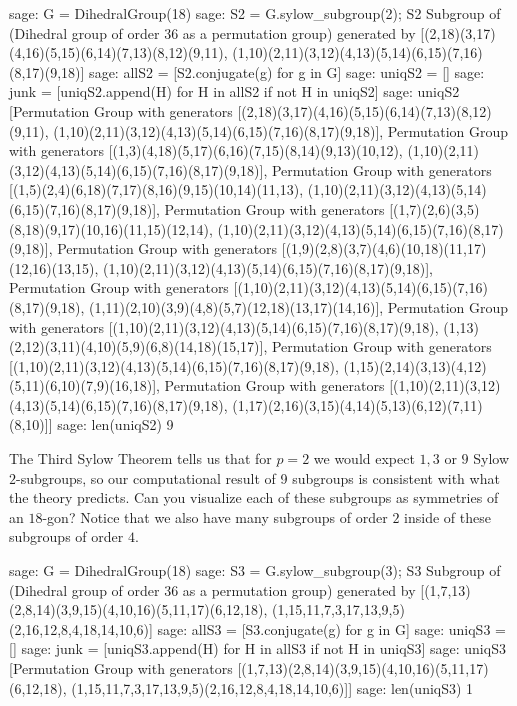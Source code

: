 \begin{sageexample}
sage: G = DihedralGroup(18)
sage: S2 = G.sylow_subgroup(2); S2
Subgroup of (Dihedral group of order 36 as a permutation group) 
generated by 
[(2,18)(3,17)(4,16)(5,15)(6,14)(7,13)(8,12)(9,11), 
(1,10)(2,11)(3,12)(4,13)(5,14)(6,15)(7,16)(8,17)(9,18)]
sage: allS2 = [S2.conjugate(g) for g in G]
sage: uniqS2 = []
sage: junk = [uniqS2.append(H) for H in allS2 if not H in uniqS2]
sage: uniqS2
[Permutation Group with generators 
[(2,18)(3,17)(4,16)(5,15)(6,14)(7,13)(8,12)(9,11), 
(1,10)(2,11)(3,12)(4,13)(5,14)(6,15)(7,16)(8,17)(9,18)], 
Permutation Group with generators 
[(1,3)(4,18)(5,17)(6,16)(7,15)(8,14)(9,13)(10,12), 
(1,10)(2,11)(3,12)(4,13)(5,14)(6,15)(7,16)(8,17)(9,18)], 
Permutation Group with generators 
[(1,5)(2,4)(6,18)(7,17)(8,16)(9,15)(10,14)(11,13), 
(1,10)(2,11)(3,12)(4,13)(5,14)(6,15)(7,16)(8,17)(9,18)], 
Permutation Group with generators 
[(1,7)(2,6)(3,5)(8,18)(9,17)(10,16)(11,15)(12,14), 
(1,10)(2,11)(3,12)(4,13)(5,14)(6,15)(7,16)(8,17)(9,18)], 
Permutation Group with generators 
[(1,9)(2,8)(3,7)(4,6)(10,18)(11,17)(12,16)(13,15), 
(1,10)(2,11)(3,12)(4,13)(5,14)(6,15)(7,16)(8,17)(9,18)], 
Permutation Group with generators 
[(1,10)(2,11)(3,12)(4,13)(5,14)(6,15)(7,16)(8,17)(9,18), 
(1,11)(2,10)(3,9)(4,8)(5,7)(12,18)(13,17)(14,16)], 
Permutation Group with generators 
[(1,10)(2,11)(3,12)(4,13)(5,14)(6,15)(7,16)(8,17)(9,18), 
(1,13)(2,12)(3,11)(4,10)(5,9)(6,8)(14,18)(15,17)], 
Permutation Group with generators 
[(1,10)(2,11)(3,12)(4,13)(5,14)(6,15)(7,16)(8,17)(9,18), 
(1,15)(2,14)(3,13)(4,12)(5,11)(6,10)(7,9)(16,18)], 
Permutation Group with generators 
[(1,10)(2,11)(3,12)(4,13)(5,14)(6,15)(7,16)(8,17)(9,18), 
(1,17)(2,16)(3,15)(4,14)(5,13)(6,12)(7,11)(8,10)]]
sage: len(uniqS2)
9
\end{sageexample}
%
The Third Sylow Theorem tells us that for $p=2$ we would expect $1, 3\text{ or }9$ Sylow $2$-subgroups, so our computational result of 9 subgroups is consistent with what the theory predicts.  Can you visualize each of these subgroups as symmetries of an $18$-gon?  Notice that we also have many subgroups of order $2$ inside of these subgroups of order $4$.
%
\begin{sageexample}
sage: G = DihedralGroup(18)
sage: S3 = G.sylow_subgroup(3); S3
Subgroup of (Dihedral group of order 36 as a permutation group) 
generated by 
[(1,7,13)(2,8,14)(3,9,15)(4,10,16)(5,11,17)(6,12,18), 
(1,15,11,7,3,17,13,9,5)(2,16,12,8,4,18,14,10,6)]
sage: allS3 = [S3.conjugate(g) for g in G]
sage: uniqS3 = []
sage: junk = [uniqS3.append(H) for H in allS3 if not H in uniqS3]
sage: uniqS3
[Permutation Group with generators 
[(1,7,13)(2,8,14)(3,9,15)(4,10,16)(5,11,17)(6,12,18), 
(1,15,11,7,3,17,13,9,5)(2,16,12,8,4,18,14,10,6)]]
sage: len(uniqS3)
1
\end{sageexample}
